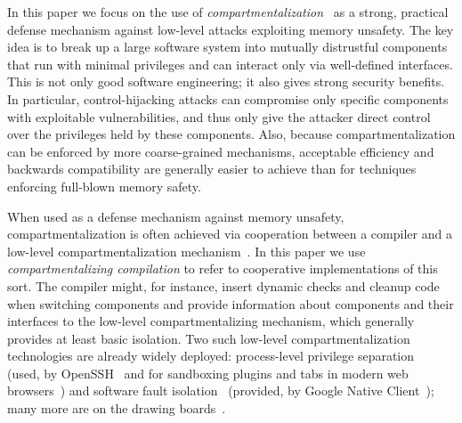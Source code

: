 \documentclass[10pt, conference, compsocconf, letterpaper, times]{IEEEtran}
\begin{document}
In this paper we focus on the use of
{\em compartmentalization}~\cite{GudkaWACDLMNR15, cheri_oakland2015,
  wedge_nsdi2008} as a strong, practical defense mechanism
against low-level attacks exploiting memory unsafety.
The key idea is to break up a large software system into
mutually distrustful components that run with minimal
privileges and can interact only via well-defined interfaces.
This is not only good software engineering; it also gives strong security
benefits.  In particular, control-hijacking attacks can compromise only
specific components with exploitable vulnerabilities, and thus only give the
attacker direct control over the privileges held by these components.
Also, because compartmentalization can be enforced by more coarse-grained
mechanisms, acceptable efficiency and backwards compatibility are generally
easier to achieve than for techniques enforcing full-blown memory safety.

\iffull
{}\fi
When used as a defense mechanism against memory unsafety,
compartmentalization is often achieved via cooperation
between a compiler and a low-level compartmentalization
mechanism~\cite{KrollSA14, ZengTE13, JuglaretHAPST15, GudkaWACDLMNR15,
  PatrignaniDP16, cheri_oakland2015, cheri_asplos2015}.
In this paper we use {\em compartmentalizing compilation} to refer to
cooperative implementations of this sort.
The compiler might, for instance, insert dynamic checks and cleanup
code when switching components and provide information about
components and their interfaces to the low-level compartmentalizing
mechanism, which generally provides at least basic
isolation.
Two such low-level compartmentalization technologies are already widely
deployed: process-level privilege separation~\cite{Kilpatrick03,
  GudkaWACDLMNR15, wedge_nsdi2008} (used, \EG by OpenSSH~\cite{ProvosFH03}
and for sandboxing plugins and tabs in modern web browsers~\cite{ReisG09})
and software fault isolation~\cite{sfi_sosp1993} (provided, \EG by
Google Native Client~\cite{YeeSDCMOONF10}); many more
are on the drawing boards~\cite{micropolicies2015, sgx, PatrignaniDP16,
  cheri_oakland2015, cheri_asplos2015}.
\end{document}
